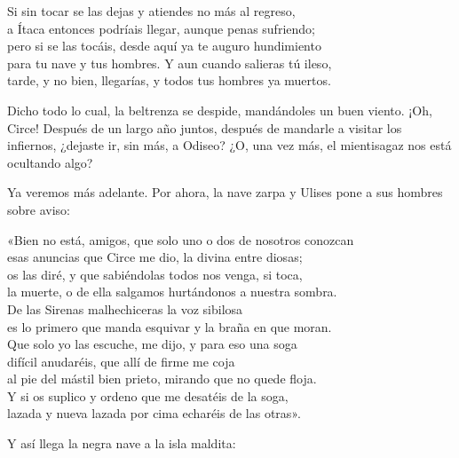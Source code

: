 \begin{versocita}
Si sin tocar se las dejas y atiendes no más al regreso,\\
a Ítaca entonces podríais llegar, aunque penas sufriendo;\\
pero si se las tocáis, desde aquí ya te auguro hundimiento\\
para tu nave y tus hombres. Y aun cuando salieras tú ileso,\\
tarde, y no bien, llegarías, y todos tus hombres ya muertos.
\end{versocita}

Dicho todo lo cual, la beltrenza se despide, mandándoles un buen viento. ¡Oh, Circe! Después de un largo año juntos, después de mandarle a visitar los infiernos, ¿dejaste ir, sin más, a Odiseo? ¿O, una vez más, el mientisagaz nos está ocultando algo?

Ya veremos más adelante. Por ahora, la nave zarpa y Ulises pone a sus hombres sobre aviso:

\begin{versocita}
«Bien no está, amigos, que solo uno o dos de nosotros conozcan\\
esas anuncias que Circe me dio, la divina entre diosas;\\
os las diré, y que sabiéndolas todos nos venga, si toca,\\
la muerte, o de ella salgamos hurtándonos a nuestra sombra.\\
De las Sirenas malhechiceras la voz sibilosa\\
es lo primero que manda esquivar y la braña en que moran.\\
Que solo yo las escuche, me dijo, y para eso una soga\\
difícil anudaréis, que allí de firme me coja\\
al pie del mástil bien prieto, mirando que no quede floja.\\
Y si os suplico y ordeno que me desatéis de la soga,\\
lazada y nueva lazada por cima echaréis de las otras».
\end{versocita}

Y así llega la negra nave a la isla maldita:


